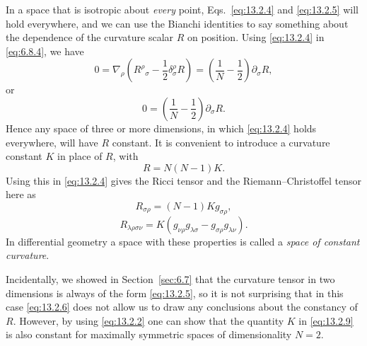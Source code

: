 In a space that is isotropic about \emph{every} point,
Eqs.~\eqref{eq:13.2.4} and \eqref{eq:13.2.5} will hold everywhere, and
we can use the Bianchi identities to say something about the dependence of
the curvature scalar \(R\) on position. Using \eqref{eq:13.2.4} in
\eqref{eq:6.8.4}, we have
\[
  0
  =
  \nabla_\rho
  \left(
    R^\rho{}_\sigma-\frac12\delta^\rho_\sigma R
  \right)
  =
  \left(\frac1N-\frac12\right)\partial_\sigma R,
\]
or
\begin{equation}
  0
  =
  \left(\frac1N-\frac12\right)\partial_\sigma R.
  \tag{13.2.6}\label{eq:13.2.6}
\end{equation}
Hence any space of three or more dimensions, in which
\eqref{eq:13.2.4} holds everywhere, will have \(R\) constant. It is
convenient to introduce a curvature constant \(K\) in place of \(R\), with
\begin{equation}
  R=N(N-1)K.
  \tag{13.2.7}\label{eq:13.2.7}
\end{equation}
Using this in \eqref{eq:13.2.4} gives the Ricci tensor and the
Riemann--Christoffel tensor here as
\begin{equation}
  R_{\sigma\rho}=(N-1)K g_{\sigma\rho},
  \tag{13.2.8}\label{eq:13.2.8}
\end{equation}
\begin{equation}
  R_{\lambda\rho\sigma\nu}
  =
  K\left(
    g_{\nu\rho}g_{\lambda\sigma}
    -g_{\sigma\rho}g_{\lambda\nu}
  \right).
  \tag{13.2.9}\label{eq:13.2.9}
\end{equation}
In differential geometry a space with these properties is called a
\emph{space of constant curvature}.

Incidentally, we showed in Section~\ref{sec:6.7} that the curvature tensor in
two dimensions is always of the form \eqref{eq:13.2.5}, so it is not
surprising that in this case \eqref{eq:13.2.6} does not allow us to draw any
conclusions about the constancy of \(R\). However, by using
\eqref{eq:13.2.2} one can show that the quantity \(K\) in
\eqref{eq:13.2.9} is also constant for maximally symmetric spaces of
dimensionality \(N=2\).

